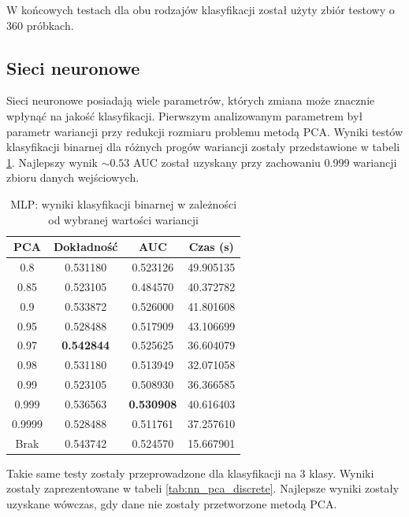 \documentclass[a4paper, twoside, 11pt, openright]{article}
\begin{document}
W końcowych testach dla obu rodzajów klasyfikacji został użyty zbiór testowy o 360 próbkach.

\subsection{Sieci neuronowe}

Sieci neuronowe posiadają wiele parametrów, których zmiana może znacznie wpłynąć na jakość klasyfikacji. Pierwszym analizowanym parametrem był parametr wariancji przy redukcji rozmiaru problemu metodą PCA. Wyniki testów klasyfikacji binarnej dla różnych progów wariancji zostały przedstawione w tabeli \ref{tab:nn_pca_binary}. Najlepszy wynik $\sim 0.53$ AUC został uzyskany przy zachowaniu 0.999 wariancji zbioru danych wejściowych.

\begin{table}[H]
    \centering
    \begin{tabular}{|c|c|c|c|}
    \hline
        \textbf{PCA} & \textbf{Dokładność} &  \textbf{AUC} &  \textbf{Czas (s)} \\ \hline
0.8                &  0.531180 &  0.523126 &   49.905135 \\ \hline
0.85               &  0.523105 &  0.484570 &   40.372782 \\ \hline
0.9                &  0.533872 &  0.526000 &   41.801608 \\ \hline
0.95               &  0.528488 &  0.517909 &   43.106699 \\ \hline
0.97               &  \textbf{0.542844} &  0.525625 &   36.604079 \\ \hline
0.98               &  0.531180 &  0.513949 &   32.071058 \\ \hline
0.99               &  0.523105 &  0.508930 &   36.366585 \\ \hline
0.999              &  0.536563 &  \textbf{0.530908} &   40.616403 \\ \hline
0.9999             &  0.528488 &  0.511761 &   37.257610 \\ \hline
Brak               &  0.543742 &  0.524570 &   15.667901 \\ \hline

    \end{tabular}
    \caption{MLP: wyniki klasyfikacji binarnej w zależności od wybranej wartości wariancji}
    \label{tab:nn_pca_binary}
\end{table}

Takie same testy zostały przeprowadzone dla klasyfikacji na 3 klasy. Wyniki zostały zaprezentowane w tabeli \ref{tab:nn_pca_discrete}. Najlepsze wyniki zostały uzyskane wówczas, gdy dane nie zostały przetworzone metodą PCA.
\end{document}
